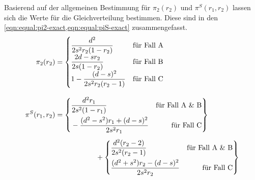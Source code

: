 Basierend auf der allgemeinen Bestimmung für $\pi_2(r_2)$ und $\pi^S(r_1,r_2)$ lassen sich die Werte für die Gleichverteilung bestimmen. Diese sind in den \cref{eqn:equal:pi2-exact,eqn:equal:piS-exact} zusammengefasst.\pagebreak
\begin{align}
	\pi_2(r_2)     & = \begin{cases}
	                       \displaystyle \frac{d^2}{2s^2r_2(1-r_2)}         & \text{für Fall~A} \\
	                       \displaystyle \frac{2d-sr_2}{2s(1-r_2)}          & \text{für Fall~B} \\
	                       \displaystyle 1 - \frac{(d-s)^2}{2s^2r_2(r_2-1)} & \text{für Fall~C}
	                   \end{cases} \label{eqn:equal:pi2-exact}\\[2ex]
	\pi^S(r_1,r_2) & = \left\{\!\begin{aligned}
	                                & \displaystyle \frac{d^2 r_1}{2s^2(1-r_1)}               & \text{für Fall~A \& B} \\
	                                & \displaystyle -\frac{(d^2-s^2) r_1 + (d-s)^2 }{2s^2r_1} & \text{für Fall~C}
	                            \end{aligned}\right\} \notag \\[1ex]
	               & \hspace{2cm} + \left\{\!\begin{aligned}
	                                             & \displaystyle \frac{d^2(r_2-2)}{2s^2(r_2-1)}          & \text{für Fall~A \& B} \\
	                                             & \displaystyle \frac{(d^2+s^2) r_2 -(d-s)^2}{2s^2r_2}  & \text{für Fall~C}
	                                         \end{aligned}\right\}\label{eqn:equal:piS-exact}
\end{align}

